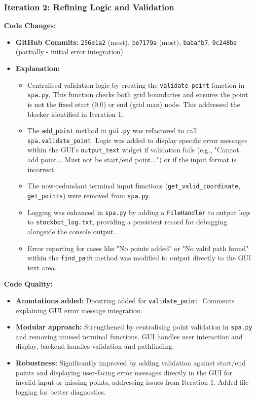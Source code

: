 \newpage


\subsubsection{Iteration 2: Refining Logic and Validation}

\textbf{Code Changes:}
\begin{itemize}
	\item \textbf{GitHub Commits:} \verb|256e1a2| (most), \verb|be7179a| (most), \verb|babafb7|, \verb|9c248be| (partially - initial error integration)
	\item \textbf{Explanation:}
	\begin{itemize}
		\item Centralised validation logic by creating the \verb|validate_point| function in \verb|spa.py|. This function checks both grid boundaries and ensures the point is not the fixed start (0,0) or end (grid max) node. This addressed the blocker identified in Iteration 1.
		\item The \verb|add_point| method in \verb|gui.py| was refactored to call \verb|spa.validate_point|. Logic was added to display specific error messages within the GUI's \verb|output_text| widget if validation fails (e.g., "Cannot add point... Must not be start/end point...") or if the input format is incorrect.
		\item The now-redundant terminal input functions (\verb|get_valid_coordinate|, \verb|get_points|) were removed from \verb|spa.py|.
		\item Logging was enhanced in \verb|spa.py| by adding a \verb|FileHandler| to output logs to \verb|stockbot_log.txt|, providing a persistent record for debugging alongside the console output.
		\item Error reporting for cases like "No points added" or "No valid path found" within the \verb|find_path| method was modified to output directly to the GUI text area.
	\end{itemize}
\end{itemize}

\textbf{Code Quality:}
\begin{itemize}
	\item \textbf{Annotations added:} Docstring added for \verb|validate_point|. Comments explaining GUI error message integration.
	\item \textbf{Modular approach:} Strengthened by centralising point validation in \verb|spa.py| and removing unused terminal functions. GUI handles user interaction and display, backend handles validation and pathfinding.
	\item \textbf{Robustness:} Significantly improved by adding validation against start/end points and displaying user-facing error messages directly in the GUI for invalid input or missing points, addressing issues from Iteration 1. Added file logging for better diagnostics.
\end{itemize}

